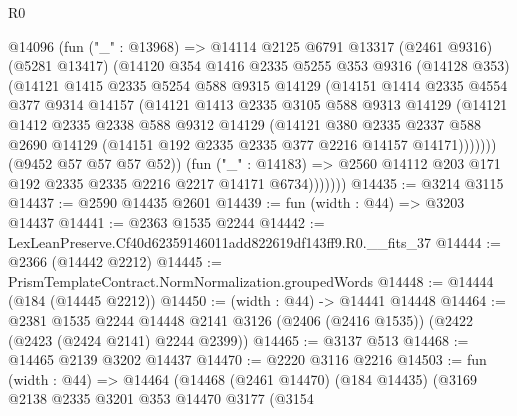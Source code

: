 \begin{lexlean}{R0}
\begin{coremodule}
                @14096
                (fun ("_" : @13968) =>
                @14114
                  @2125
                  @6791
                  @13317
                  (@2461 @9316)
                  (@5281 @13417)
                  (@14120
                    @354
                    @1416
                    @2335
                    @5255
                    @353
                    @9316
                    (@14128 @353)
                    (@14121
                      @1415
                      @2335
                      @5254
                      @588
                      @9315
                      @14129
                      (@14151
                        @1414
                        @2335
                        @4554
                        @377
                        @9314
                        @14157
                        (@14121
                          @1413
                          @2335
                          @3105
                          @588
                          @9313
                          @14129
                          (@14121
                            @1412
                            @2335
                            @2338
                            @588
                            @9312
                            @14129
                            (@14121
                              @380
                              @2335
                              @2337
                              @588
                              @2690
                              @14129
                              (@14151 @192 @2335 @2335 @377 @2216 @14157 @14171)))))))
                  (@9452 @57 @57 @57 @52))
                (fun ("_" : @14183) =>
                @2560 @14112 @203 @171 @192 @2335 @2335 @2216 @2217 @14171 @6734)))))))
@14435 := @3214 @3115
@14437 := @2590 @14435 @2601
@14439 := fun (width : @44) => @3203 @14437
@14441 := @2363 @1535 @2244
@14442 := LexLeanPreserve.Cf40d62359146011add822619df143ff9.R0.__fits_37
@14444 := @2366 (@14442 @2212)
@14445 := PrismTemplateContract.NormNormalization.groupedWords
@14448 := @14444 (@184 (@14445 @2212))
@14450 := (width : @44) -> @14441 @14448
@14464 := @2381
    @1535
    @2244
    @14448
    @2141
    @3126
    (@2406 (@2416 @1535))
    (@2422 (@2423 (@2424 @2141) @2244 @2399))
@14465 := @3137 @513
@14468 := @14465 @2139 @3202 @14437
@14470 := @2220 @3116 @2216
@14503 := fun (width : @44) =>
  @14464
    (@14468
      (@2461 @14470)
      (@184 @14435)
      (@3169
        @2138
        @2335
        @3201
        @353
        @14470
        @3177
        (@3154

\end{coremodule}
\end{lexlean}
